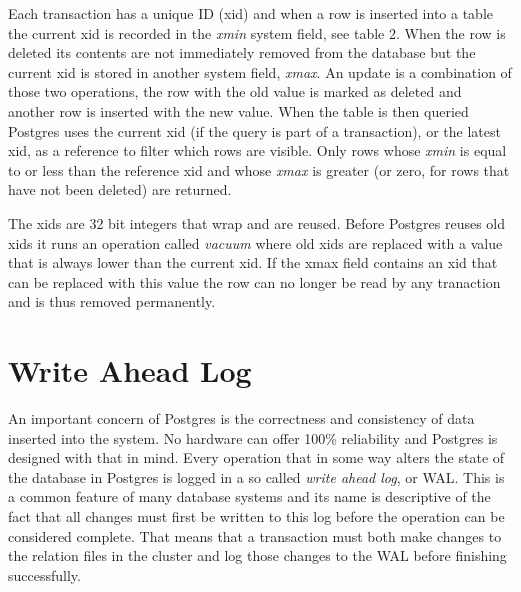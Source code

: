 \documentclass[a4paper,12pt,twoside,BCOR=10mm]{scrbook}
\begin{document}
Each transaction has a unique ID (xid) and when a row is inserted into a table the current xid is recorded in the \textit{xmin} system field, see table 2. When the row is deleted its contents are not immediately removed from the database but the current xid is stored in another system field, \textit{xmax}. An update is a combination of those two operations, the row with the old value is marked as deleted and another row is inserted with the new value. When the table is then queried Postgres uses the current xid (if the query is part of a transaction), or the latest xid, as a reference to filter which rows are visible. Only rows whose \textit{xmin} is equal to or less than the reference xid and whose \textit{xmax} is greater (or zero, for rows that have not been deleted) are returned.


The xids are 32 bit integers that wrap and are reused. Before Postgres reuses old xids it runs an operation called \textit{vacuum} where old xids are replaced with a value that is always lower than the current xid. If the xmax field contains an xid that can be replaced with this value the row can no longer be read by any tranaction and is thus removed permanently.


\section{Write Ahead Log}
An important concern of Postgres is the correctness and consistency of data inserted into the system. No hardware can offer 100\% reliability and Postgres is designed with that in mind. Every operation that in some way alters the state of the database in Postgres is logged in a so called \textit{write ahead log}, or WAL. This is a common feature of many database systems and its name is descriptive of the fact that all changes must first be written to this log before the operation can be considered complete. That means that a transaction must both make changes to the relation files in the cluster and log those changes to the WAL before finishing successfully.
\end{document}
